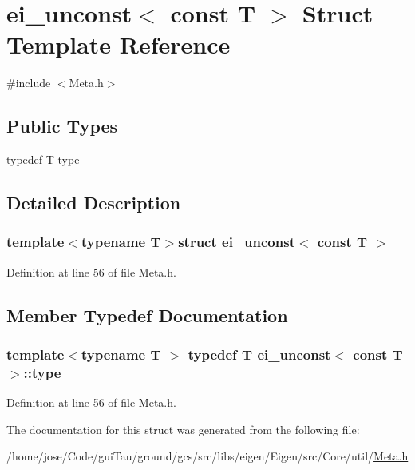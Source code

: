 \hypertarget{structei__unconst_3_01const_01_t_01_4}{\section{ei\-\_\-unconst$<$ const T $>$ Struct Template Reference}
\label{structei__unconst_3_01const_01_t_01_4}
}


{\ttfamily \#include $<$Meta.\-h$>$}

\subsection*{Public Types}
\begin{DoxyCompactItemize}
\item 
typedef T \hyperlink{structei__unconst_3_01const_01_t_01_4_a73c2f23b30b8c2d2407e279235590c8c}{type}
\end{DoxyCompactItemize}


\subsection{Detailed Description}
\subsubsection*{template$<$typename T$>$struct ei\-\_\-unconst$<$ const T $>$}



Definition at line 56 of file Meta.\-h.



\subsection{Member Typedef Documentation}
\hypertarget{structei__unconst_3_01const_01_t_01_4_a73c2f23b30b8c2d2407e279235590c8c}{
\subsubsection[{type}]{\setlength{\rightskip}{0pt plus 5cm}template$<$typename T $>$ typedef T {\bf ei\-\_\-unconst}$<$ const T $>$\-::{\bf type}}}\label{structei__unconst_3_01const_01_t_01_4_a73c2f23b30b8c2d2407e279235590c8c}


Definition at line 56 of file Meta.\-h.



The documentation for this struct was generated from the following file\-:\begin{DoxyCompactItemize}
\item 
/home/jose/\-Code/gui\-Tau/ground/gcs/src/libs/eigen/\-Eigen/src/\-Core/util/\hyperlink{_meta_8h}{Meta.\-h}\end{DoxyCompactItemize}
